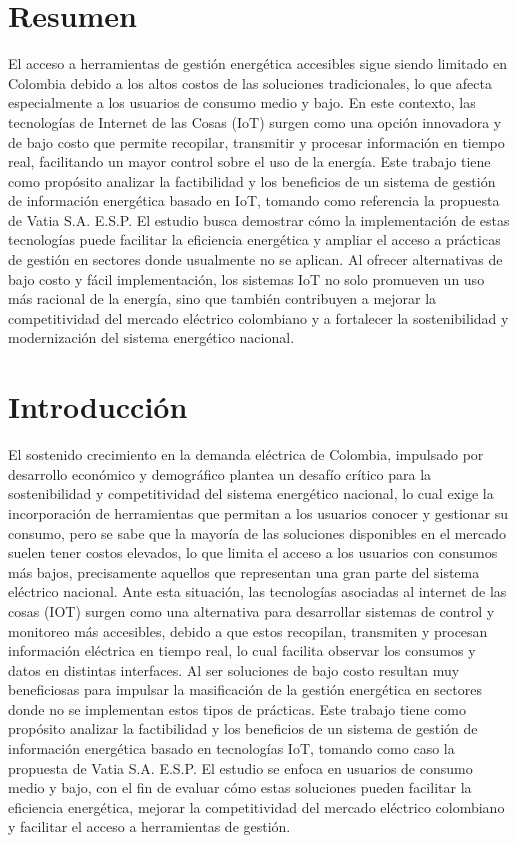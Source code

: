 \section{Resumen}
El acceso a herramientas de gestión energética accesibles sigue siendo limitado en Colombia debido a los altos costos de las soluciones tradicionales, lo que afecta especialmente a los usuarios de consumo medio y bajo. En este contexto, las tecnologías de Internet de las Cosas (IoT) surgen como una opción innovadora y de bajo costo que permite recopilar, transmitir y procesar información en tiempo real, facilitando un mayor control sobre el uso de la energía.
Este trabajo tiene como propósito analizar la factibilidad y los beneficios de un sistema de gestión de información energética basado en IoT, tomando como referencia la propuesta de Vatia S.A. E.S.P. El estudio busca demostrar cómo la implementación de estas tecnologías puede facilitar la eficiencia energética y ampliar el acceso a prácticas de gestión en sectores donde usualmente no se aplican. Al ofrecer alternativas de bajo costo y fácil implementación, los sistemas IoT no solo promueven un uso más racional de la energía, sino que también contribuyen a mejorar la competitividad del mercado eléctrico colombiano y a fortalecer la sostenibilidad y modernización del sistema energético nacional.

\section{Introducción}
El sostenido crecimiento en la demanda eléctrica de Colombia, impulsado por desarrollo económico y demográfico plantea un desafío crítico para la sostenibilidad y competitividad del sistema energético nacional, lo cual exige la incorporación de herramientas que permitan a los usuarios conocer y gestionar su consumo, pero se sabe que la mayoría de las soluciones disponibles en el mercado suelen tener costos elevados, lo que limita el acceso a los usuarios con consumos más bajos, precisamente aquellos que representan una gran parte del sistema eléctrico nacional.  
\newline
Ante esta situación, las tecnologías asociadas al internet de las cosas (IOT) surgen como una alternativa para desarrollar sistemas de control y monitoreo más accesibles, debido a que estos recopilan, transmiten y procesan información eléctrica en tiempo real, lo cual facilita observar los consumos y datos en distintas interfaces. Al ser soluciones de bajo costo resultan muy beneficiosas para impulsar la masificación de la gestión energética en sectores donde no se implementan estos tipos de prácticas.  
\newline
Este trabajo tiene como propósito analizar la factibilidad y los beneficios de un sistema de gestión de información energética basado en tecnologías IoT, tomando como caso la propuesta de Vatia S.A. E.S.P. El estudio se enfoca en usuarios de consumo medio y bajo, con el fin de evaluar cómo estas soluciones pueden facilitar la eficiencia energética, mejorar la competitividad del mercado eléctrico colombiano y facilitar el acceso a herramientas de gestión.

